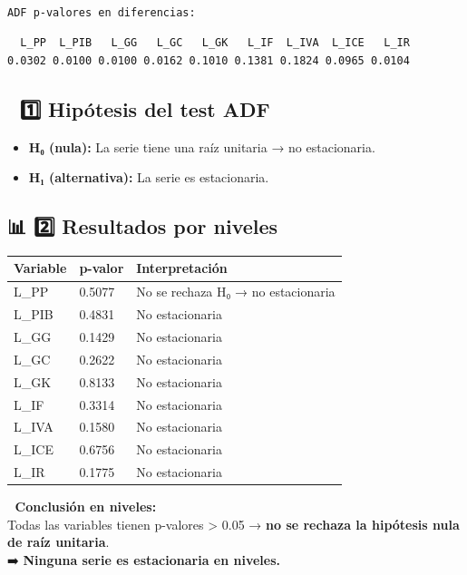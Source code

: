 \documentclass[
  spanish,
  letterpaper,
  DIV=11,
  numbers=noendperiod]{scrartcl}
\begin{document}
\begin{verbatim}

ADF p-valores en diferencias:
\end{verbatim}

\begin{verbatim}
  L_PP  L_PIB   L_GG   L_GC   L_GK   L_IF  L_IVA  L_ICE   L_IR 
0.0302 0.0100 0.0100 0.0162 0.1010 0.1381 0.1824 0.0965 0.0104 
\end{verbatim}

\subsection{\texorpdfstring{📘 \textbf{1️⃣ Hipótesis del test
ADF}}{📘 1️⃣ Hipótesis del test ADF}}\label{hipuxf3tesis-del-test-adf}

\begin{itemize}
\item
  \textbf{H₀ (nula):} La serie tiene una raíz unitaria → no
  estacionaria.
\item
  \textbf{H₁ (alternativa):} La serie es estacionaria.
\end{itemize}

\subsection{\texorpdfstring{📊 \textbf{2️⃣ Resultados por
niveles}}{📊 2️⃣ Resultados por niveles}}\label{resultados-por-niveles}

\begin{longtable}[]{@{}lll@{}}
\toprule\noalign{}
Variable & p-valor & Interpretación \\
\midrule\noalign{}
\endhead
\bottomrule\noalign{}
\endlastfoot
L\_PP & 0.5077 & No se rechaza H₀ → no estacionaria \\
L\_PIB & 0.4831 & No estacionaria \\
L\_GG & 0.1429 & No estacionaria \\
L\_GC & 0.2622 & No estacionaria \\
L\_GK & 0.8133 & No estacionaria \\
L\_IF & 0.3314 & No estacionaria \\
L\_IVA & 0.1580 & No estacionaria \\
L\_ICE & 0.6756 & No estacionaria \\
L\_IR & 0.1775 & No estacionaria \\
\end{longtable}

🔹 \textbf{Conclusión en niveles:}\\
Todas las variables tienen p-valores \textgreater{} 0.05 → \textbf{no se
rechaza la hipótesis nula de raíz unitaria}.\\
➡️ \textbf{Ninguna serie es estacionaria en niveles.}
\end{document}
